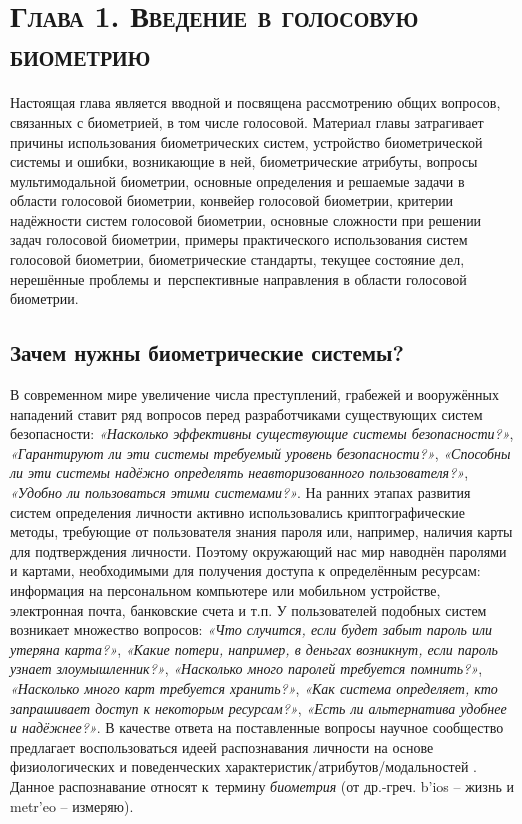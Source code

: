 \documentclass[12pt]{book}
\newcommand{\textgreek}[1]{\begingroup\fontencoding{LGR}\selectfont#1\endgroup}
\begin{document}
\chapter*{\textsc{Глава 1. Введение в голосовую биометрию}}

\thispagestyle{fancy}

\large{Настоящая глава является вводной и посвящена рассмотрению общих вопросов, связанных с биометрией, в том числе голосовой. Материал главы затрагивает причины использования биометрических систем, устройство биометрической системы и ошибки, возникающие в ней, биометрические атрибуты, вопросы мультимодальной биометрии, основные определения и решаемые задачи в области голосовой биометрии, конвейер голосовой биометрии, критерии надёжности систем голосовой биометрии, основные сложности при решении задач голосовой биометрии, примеры практического использования систем голосовой биометрии, биометрические стандарты, текущее состояние дел, нерешённые проблемы и~перспективные направления в области голосовой биометрии.}

\section{Зачем нужны биометрические системы?}
\label{sec:section_1_1}

\large{В современном мире увеличение числа преступлений, грабежей и вооружённых нападений ставит ряд вопросов перед разработчиками существующих систем безопасности: \textit{«Насколько эффективны существующие системы безопасности?»}, \textit{«Гарантируют ли эти системы требуемый уровень безопасности?»}, \textit{«Способны ли эти системы надёжно определять неавторизованного пользователя?»}, \textit{«Удобно ли пользоваться этими системами?»}. На ранних этапах развития систем определения личности активно использовались криптографические методы, требующие от пользователя знания пароля или, например, наличия карты для подтверждения личности. Поэтому окружающий нас мир наводнён паролями и картами, необходимыми для получения доступа к определённым ресурсам: информация на персональном компьютере или мобильном устройстве, электронная почта, банковские счета и т.п. У пользователей подобных систем возникает множество вопросов:  \textit{«Что случится, если будет забыт пароль или утеряна карта?»}, \textit{«Какие потери, например, в деньгах возникнут, если пароль узнает злоумышленник?»}, \textit{«Насколько много паролей требуется помнить?»}, \textit{«Насколько много карт требуется хранить?»}, \textit{«Как система определяет, кто запрашивает доступ к некоторым ресурсам?»}, \textit{«Есть ли альтернатива удобнее и надёжнее?»}. В качестве ответа на поставленные вопросы научное сообщество предлагает воспользоваться идеей распознавания личности на основе физиологических и поведенческих характеристик/атрибутов/модальностей \cite{unar_2014}. Данное распознавание относят к~термину \textit{биометрия} (от др.-греч. \textgreek{b'ios} -- жизнь и \textgreek{metr'eo} -- измеряю).}
\end{document}
